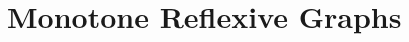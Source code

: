 \documentclass[a4paper,handout]{beamer}
\theoremstyle{definition}
\begin{document}
\section{Monotone Reflexive Graphs}

\begin{frame}
\end{frame}
\end{document}
